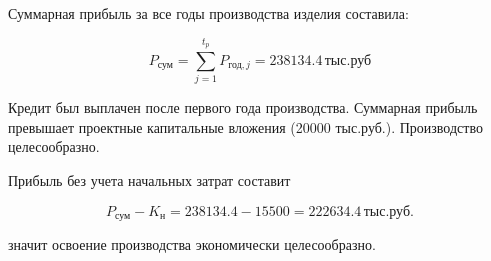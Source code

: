 \conclusion

Суммарная прибыль за все годы производства изделия составила:

\[
P_{\text{сум}} = \sum_{j=1}^{t_p} P_{\text{год},j} = 238134.4 \, \text{тыс.руб}
\]

Кредит был выплачен после первого года производства. Суммарная
прибыль превышает проектные капитальные вложения (20000 тыс.руб.).
Производство целесообразно.

Прибыль без учета начальных затрат составит

\[
    P_{\text{сум}} - K_{\text{н}} = 238134.4 - 15500 = 222634.4 \, \text{тыс.руб.}
\]

значит освоение производства экономически целесообразно.

